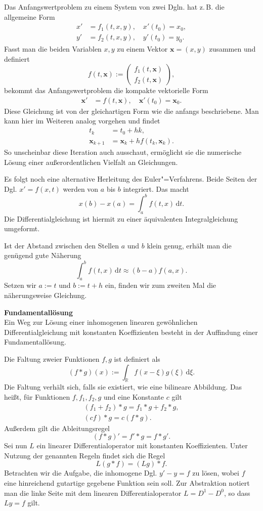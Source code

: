 \documentclass[paper=180mm:225mm,pagesize=auto,fleqn,twoside,11pt,dvipdfmx]{scrartcl}
\theoremstyle{rmbox}
\newenvironment{Rezept}[1]{\strong{#1}\\}{}
\newcommand{\strong}[1]{\textsf{\textbf{#1}}}
\newcommand{\bv}[1]{\mathbf{#1}}
\newcommand{\R}{\mathbb R}
\begin{document}
Das Anfangswertproblem zu einem System von zwei Dgln. hat
z.\,B. die allgemeine Form%
\[\begin{split}
x' &= f_1(t,x,y),\quad x'(t_0)=x_0,\\
y' &= f_2(t,x,y),\quad y'(t_0)=y_0.
\end{split}\]
Fasst man die beiden Variablen $x,y$ zu einem Vektor
$\bv x = (x,y)$ zusammen und definiert%
\[
f(t,\bv x) := \begin{pmatrix}
f_1(t,\bv x)\\
f_2(t,\bv x)
\end{pmatrix},
\]
bekommt das Anfangswertproblem die kompakte
vektorielle Form
\[\begin{split}
\bv x' &= f(t,\bv x),\quad \bv x'(t_0)=\bv x_0.
\end{split}\]
Diese Gleichung ist von der gleichartigen Form wie die anfangs
beschriebene. Man kann hier im Weiteren analog vorgehen und findet%
\begin{align*}
t_{k} &= t_0+hk,\\
\bv x_{k+1} &= \bv x_k+hf(t_k,\bv x_k).
\end{align*}
So unscheinbar diese Iteration auch ausschaut, ermöglicht sie die
numerische Lösung einer außerordentlichen Vielfalt an Gleichungen.

Es folgt noch eine alternative Herleitung des Euler"=Verfahrens. Beide
Seiten der Dgl. $x'=f(x,t)$ werden
von $a$ bis $b$ integriert. Das macht%
\[x(b)-x(a) = \int_a^b f(t,x)\,\mathrm dt.\]
Die Differentialgleichung ist hiermit zu einer äquivalenten
Integralgleichung umgeformt.

Ist der Abstand zwischen den Stellen
$a$ und $b$ klein genug, erhält
man die genügend gute Näherung%
\[\int_a^b f(t,x)\,\mathrm dt \approx (b-a)f(a,x).\]
Setzen wir $a:=t$ und $b:=t+h$ ein, finden wir
zum zweiten Mal die näherungsweise Gleichung.

\begin{Rezept}{Fundamentallösung}
Ein Weg zur Lösung einer inhomogenen linearen gewöhnlichen
Differentialgleichung mit konstanten Koeffizienten
besteht in der Auffindung einer Fundamentallösung.
\end{Rezept}

\noindent
Die Faltung zweier Funktionen $f,g$ ist definiert als
\[(f*g)(x) := \int_\R f(x-\xi)g(\xi)\,\mathrm d\xi.\]
Die Faltung verhält sich, falls sie existiert, wie eine bilineare
Abbildung. Das heißt, für Funktionen $f,f_1,f_2,g$ und eine
Konstante $c$ gilt
\begin{gather*}
(f_1+f_2)*g = f_1*g + f_2*g,\\
(c f)*g = c(f*g).
\end{gather*}
Außerdem gilt die Ableitungsregel
\[(f*g)' = f'*g = f*g'.\]
Sei nun $L$ ein linearer Differentialoperator mit konstanten
Koeffizienten. Unter Nutzung der genannten Regeln findet sich die
Regel
\[L(g*f) = (Lg)*f.\]
Betrachten wir die Aufgabe, die inhomogene Dgl. $y' - y = f$ zu lösen,
wobei $f$ eine hinreichend gutartige gegebene Funktion sein soll.
Zur Abstraktion notiert man die linke Seite mit dem linearen
Differentialoperator $L=D^1-D^0$, so dass $Ly = f$ gilt.
\end{document}
